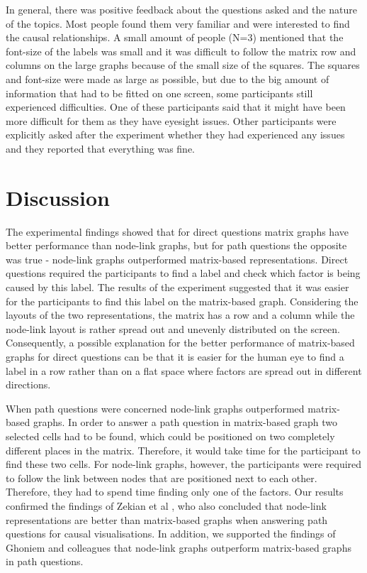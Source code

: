 \documentclass{l4proj}
\begin{document}
In general, there was positive feedback about the questions asked and the nature of the topics. Most people found them very familiar and were interested to find the causal relationships. A small amount of people (N=3) mentioned that the font-size of the labels was small and it was difficult to follow the matrix row and columns on the large graphs because of the small size of the squares. The squares and font-size were made as large as possible, but due to the big amount of information that had to be fitted on one screen, some participants still experienced difficulties. One of these participants said that it might have been more difficult for them as they have eyesight issues. Other participants were explicitly asked after the experiment whether they had experienced any issues and they reported that everything was fine.

\chapter{Discussion}

The experimental findings showed that for direct questions matrix graphs have better performance than node-link graphs, but for path questions the opposite was true - node-link graphs outperformed matrix-based representations. Direct questions required the participants to find a label and check which factor is being caused by this label. The results of the experiment suggested that it was easier for the participants to find this label on the matrix-based graph. Considering the layouts of the two representations, the matrix has a row and a column while the node-link layout is rather spread out and unevenly distributed on the screen. Consequently, a possible explanation for the better performance of matrix-based graphs for direct questions can be that it is easier for the human eye to find a label in a row rather than on a flat space where factors are spread out in different directions. 

When path questions were concerned node-link graphs outperformed matrix-based graphs. In order to answer a path question in matrix-based graph two selected cells had to be found, which could be positioned on two completely different places in the matrix. Therefore, it would take time for the participant to find these two cells. For node-link graphs, however, the participants were required to follow the link between nodes that are positioned next to each other. Therefore, they had to spend time finding only one of the factors. Our results confirmed the findings of Zekian et al \cite{sheny2007path}, who also concluded that node-link representations are better than matrix-based graphs when answering path questions for causal visualisations. In addition, we supported the findings of Ghoniem and colleagues \cite{ghoniem2004comparison} that node-link graphs outperform matrix-based graphs in path questions.
\end{document}
